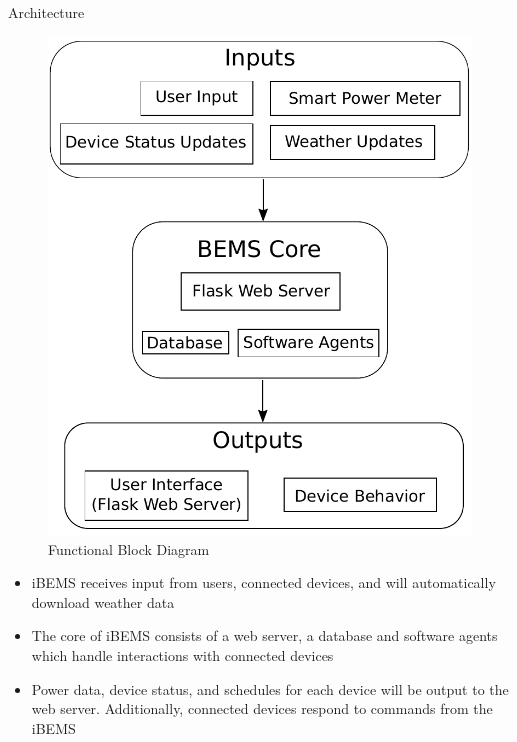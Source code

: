 \documentclass{beamer}
\begin{document}
\begin{frame}{Architecture}{} %
    \begin{multicols}{2}
        \begin{figure}
            \centering
            \includegraphics[scale=0.4]{figs/functionalBlockDiagram.pdf}
            \caption{Functional Block Diagram}
            \label{fig:functional_bd}
        \end{figure}
        
        \begin{small}
            \begin{itemize}
                \item iBEMS receives input from users, connected devices, and will automatically download weather data
                \item The core of iBEMS consists of a web server, a database and software agents which handle interactions with connected devices
                \item Power data, device status, and schedules for each device will be output to the web server. Additionally, connected devices respond to commands from the iBEMS
            \end{itemize}
        \end{small}
    \end{multicols}
\end{frame}
\end{document}
